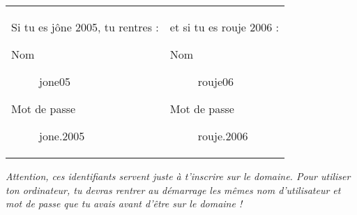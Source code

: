 
\begin{center}
\begin{tabular}{ll}
  \parbox{.45\textwidth}{
  Si tu es j\^one 2005, tu rentres :
  \begin{description}
    \item[Nom] jone05
    \item[Mot de passe] jone.2005
  \end{description}
  }
& \parbox{.45\textwidth}{
  et si tu es rouje 2006 :
  \begin{description}
    \item[Nom] rouje06
    \item[Mot de passe] rouje.2006
  \end{description}
  }
\\
\end{tabular}
\end{center}

\emph{Attention, ces identifiants servent juste \`a t'inscrire sur le
domaine. Pour utiliser ton ordinateur, tu devras rentrer au
d\'emarrage les m\^emes nom d'utilisateur et mot de passe que tu avais
avant d'\^etre sur le domaine !}







